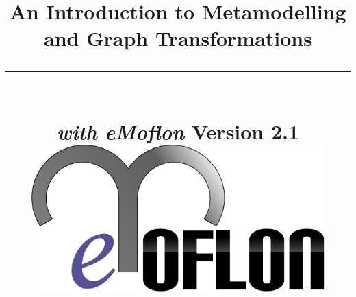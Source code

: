 \title{
\flushright
{\LARGE\bfseries An Introduction to Metamodelling\\
and Graph Transformations}
\noindent\rule[-1ex]{\textwidth}{5pt}\\[2.5ex]
\hfill\emph{\LARGE\bfseries with eMoflon}
\flushleft
{\small Version 2.1}
\flushright
\includegraphics[width=0.85\textwidth]{pics/eMoflon3} 
}

\date{}  
\author{} 